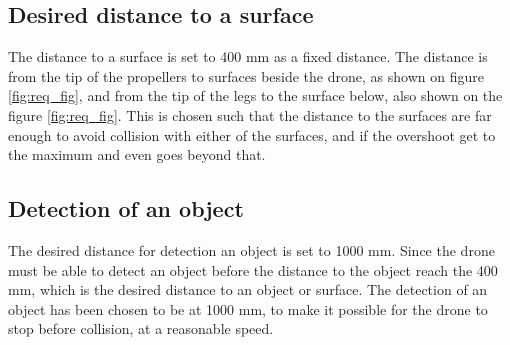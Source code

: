 


\subsection*{Desired distance to a surface}
The distance to a surface is set to 400 mm as a fixed distance. The distance is from the tip of the propellers to surfaces beside the drone, as shown on figure \ref{fig:req_fig}, and from the tip of the legs to the surface below, also shown on the figure \ref{fig:req_fig}. This is chosen such that the distance to the surfaces are far enough to avoid collision with either of the surfaces, and if the overshoot get to the maximum and even goes beyond that. 

\subsection*{Detection of an object}
The desired distance for detection an object is set to 1000 mm. Since the drone must be able to detect an object before the distance to the object reach the 400 mm, which is the desired distance to an object or surface. The detection of an object has been chosen to be at 1000 mm, to make it possible for the drone to stop before collision, at a reasonable speed.%

